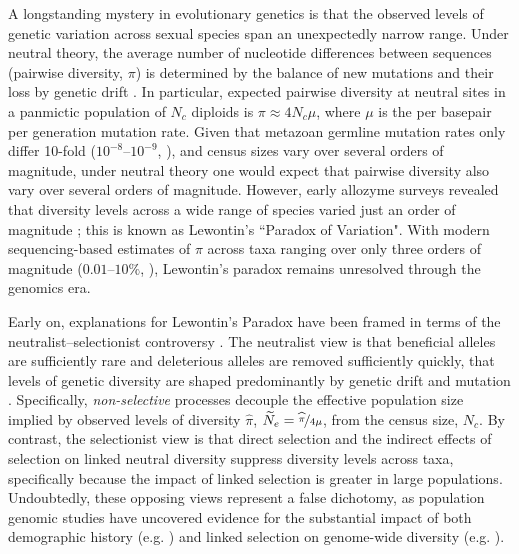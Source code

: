 \documentclass[9pt,lineno]{elife}
\begin{document}
A longstanding mystery in evolutionary genetics is that the observed levels of
genetic variation across sexual species span an unexpectedly narrow range.
Under neutral theory, the average number of nucleotide differences between
sequences (pairwise diversity, $\pi$) is determined by the balance of new
mutations and their loss by genetic drift
\citep{Kimura1964-ul,Malecot1948-zv,Wright1931-fl}. In particular, expected
pairwise diversity at neutral sites in a panmictic population of $N_c$ diploids
is $\pi \approx 4N_c \mu$, where $\mu$ is the per basepair per generation
mutation rate. Given that metazoan germline mutation rates only differ 10-fold
($10^{-8}$--$10^{-9}$, \cite{Kondrashov2010-fi,Lynch2010-ki}), and census sizes
vary over several orders of magnitude, under neutral theory one would expect
that pairwise diversity also vary over several orders of magnitude.  However,
early allozyme surveys revealed that diversity levels across a wide range of
species varied just an order of magnitude \citep[][p. 208]{Lewontin1974-jb};
this is known as Lewontin's ``Paradox of Variation".  With modern
sequencing-based estimates of $\pi$ across taxa ranging over only three orders
of magnitude ($0.01$--$10\%$, \cite{Leffler2012-zj}), Lewontin's paradox
remains unresolved through the genomics era.

Early on, explanations for Lewontin's Paradox have been framed in terms of the
neutralist--selectionist controversy
\citep{Lewontin1974-jb,Kimura1984-ia,Gillespie1991-qa,Gillespie2001-mv}.  The
neutralist view is that beneficial alleles are sufficiently rare and
deleterious alleles are removed sufficiently quickly, that levels of genetic
diversity are shaped predominantly by genetic drift and mutation
\citep{Kimura1984-ia}. Specifically, \emph{non-selective} processes decouple
the effective population size implied by observed levels of diversity
$\widehat{\pi}$, $\widetilde{N}_e = \nicefrac{\widehat{\pi}}{4\mu}$, from the
census size, $N_c$. By contrast, the selectionist view is that direct selection
and the indirect effects of selection on linked neutral diversity suppress
diversity levels across taxa, specifically because the impact of linked
selection is greater in large populations. Undoubtedly, these opposing views
represent a false dichotomy, as population genomic studies have uncovered
evidence for the substantial impact of both demographic history (e.g.
\cite{Zhao2013-vd,Palkopoulou2015-bg}) and linked selection on genome-wide
diversity (e.g.
\cite{Elyashiv2016-vt,Begun1992-ey,Aguade1989-jx,McVicker2009-ax}). 
\end{document}
